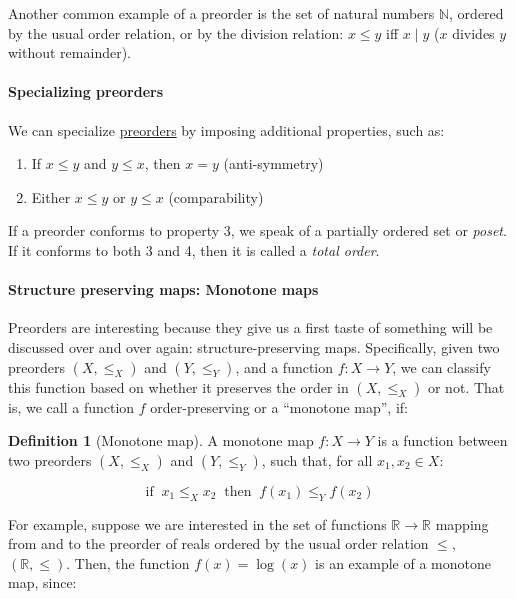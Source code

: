 \documentclass[
  openany]{book}
\providecommand{\tightlist}{%
  \setlength{\itemsep}{0pt}\setlength{\parskip}{0pt}}
\theoremstyle{definition}
\newtheorem{definition}{Definition}[chapter]
\theoremstyle{definition}
\theoremstyle{definition}
\theoremstyle{definition}
\theoremstyle{remark}
\begin{document}
Another common example of a preorder is the set of natural numbers \(\mathbb{N}\), ordered by the usual order relation, or by the division relation: \(x \leq y\) iff \(x \mid y\) (\(x\) divides \(y\) without remainder).

\paragraph{Specializing preorders}\label{specializing-preorders}

We can specialize \hyperref[preorders]{preorders} by imposing additional properties, such as:

\begin{enumerate}
\def\labelenumi{\arabic{enumi}.}
\setcounter{enumi}{2}
\tightlist
\item
  If \(x \leq y\) and \(y \leq x\), then \(x = y\) (anti-symmetry)
\item
  Either \(x \leq y\) or \(y \leq x\) (comparability)
\end{enumerate}

If a preorder conforms to property 3, we speak of a partially ordered set or \emph{poset}. If it conforms to both 3 and 4, then it is called a \emph{total order}.

\paragraph{Structure preserving maps: Monotone maps}\label{structure-preserving-maps-monotone-maps}

Preorders are interesting because they give us a first taste of something will be discussed over and over again: structure-preserving maps. Specifically, given two preorders \((X, \leq_X)\) and \((Y, \leq_Y)\), and a function \(f: X \to Y\), we can classify this function based on whether it preserves the order in \((X, \leq_X)\) or not. That is, we call a function \(f\) order-preserving or a ``monotone map'', if:

\begin{definition}[Monotone map]
A monotone map \(f: X \to Y\) is a function between two preorders \((X, \leq_X)\) and \((Y, \leq_Y)\), such that, for all \(x_1, x_2 \in X\):

\[\text{if} \;\; x_1 \leq_X x_2 \;\; \text{then} \;\; f(x_1) \leq_Y f(x_2) \]
\end{definition}

For example, suppose we are interested in the set of functions \(\mathbb{R} \to \mathbb{R}\) mapping from and to the preorder of reals ordered by the usual order relation \(\leq\), \((\mathbb{R}, \leq)\). Then, the function \(f(x) = \log(x)\) is an example of a monotone map, since:
\end{document}
